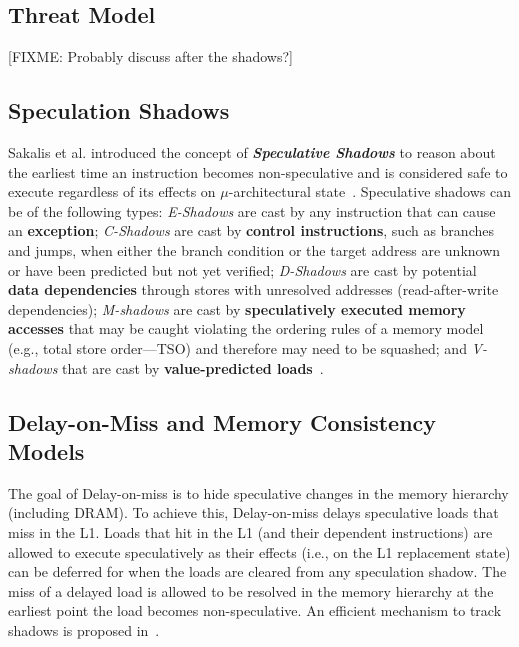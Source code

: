 \subsection{Threat Model}
\label{sec:threat}
{ \color{red} [FIXME: Probably discuss after the shadows?] }

\subsection{Speculation Shadows} 
Sakalis et al. introduced the concept of \textbf{\emph{Speculative Shadows}} to reason about the earliest time an instruction becomes non-speculative and is considered safe to execute regardless of its effects on $\mu$-architectural state~\cite{sakalis2019efficient}.
Speculative shadows can be of the following types: \emph{E-Shadows} are cast by any instruction that can cause an \textbf{exception}; 
\emph{C-Shadows} are cast by \textbf{control instructions}, such as branches and jumps, when either the branch condition or the target address are unknown or have been predicted but not yet verified; \emph{D-Shadows} are cast by potential \textbf{data dependencies} through stores with unresolved addresses (read-after-write dependencies); \emph{M-shadows} are cast by \textbf{speculatively executed memory accesses} that may be caught violating the ordering rules of a memory model (e.g., total store order---TSO) and therefore may need to be squashed; and \emph{V-shadows} that are cast by \textbf{value-predicted loads}~\cite{sakalis2019efficient}.

\subsection{Delay-on-Miss and Memory Consistency Models}
\label{sec:dom-vp}
The goal of Delay-on-miss is to hide speculative changes in the memory hierarchy (including DRAM). 
To achieve this, Delay-on-miss delays speculative loads that miss in the L1. Loads that hit in the L1 (and their dependent instructions) are allowed to execute speculatively as their effects (i.e., on the L1 replacement state) can be deferred for when the loads are cleared from any speculation shadow. 
The miss of a delayed load is allowed to be resolved in the memory hierarchy at the earliest point the load becomes non-speculative. An efficient mechanism to track shadows is proposed in~\cite{sakalis2019efficient}. 

